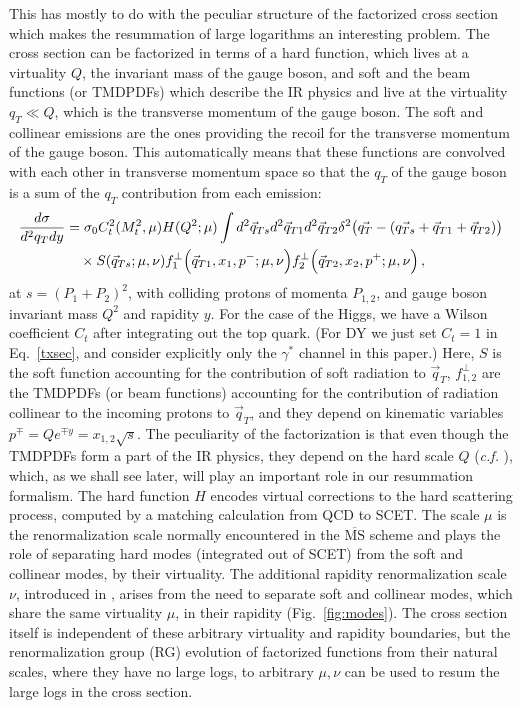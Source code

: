 \documentclass[a4,letterpaper,11pt]{article}
\newcommand{\nn}{\nonumber}
\newcommand{\MSbar}{\overline{\text{MS}}}
\newcommand{\eq}[1]{Eq.~\eqref{#1}}
\newcommand{\fig}[1]{Fig.~\ref{fig:#1}}
\begin{document}
This has mostly to do with the peculiar structure of the factorized cross section which makes the resummation of large logarithms an interesting problem. The cross section can be factorized in terms of a hard function, which lives at a virtuality $Q$, the invariant mass of the gauge boson, and soft and the beam functions (or TMDPDFs) which describe the IR physics and live at the virtuality $q_T \ll Q$, which is the transverse momentum of the gauge boson. The soft and collinear emissions are the ones providing the recoil for the transverse momentum of the gauge boson. This automatically means that these functions are convolved with each other in transverse momentum space so that the $q_T$ of the gauge boson is a sum of the $q_T$ contribution from each emission:
\begin{align}
\label{txsec}
\frac{ d \sigma} {d^2 q_T dy} &= \sigma_0 C_t^2(M_t^2,\mu) H (Q^2; \mu ) \int d^2 \vec{q}_{Ts} d^2 \vec{q}_{T1} d^2\vec{q}_{T2}  \delta^2\bigl(\vec{q_T} - (\vec{q_{Ts}} +\vec{q}_{T1}+\vec{q}_{T2}) \bigr)  \\
&\quad\times S( \vec{q}_{Ts} ;\mu,\nu) f_1^{\perp}\Bigl(\vec{q}_{T1}, x_1, p^-;\mu ,\nu\Bigr)f_2^{\perp}\Bigl(\vec{q}_{T2},x_2, p^+;\mu ,\nu\Bigr) \,, \nn
\end{align}
at $s=(P_1+P_2)^2$, with colliding protons of momenta $P_{1,2}$, and gauge boson invariant mass $Q^2$ and rapidity $y$. For the case of the Higgs, we have a Wilson coefficient $C_t$ after integrating out the top quark. (For DY we  just set $C_t=1$ in \eq{txsec}, and consider explicitly only the $\gamma^*$ channel in this paper.)
Here, $S$ is the soft function accounting for the contribution of soft radiation to $\vec{q}_T$, $f_{1,2}^\perp$ are the TMDPDFs (or beam functions) accounting for the contribution of radiation collinear to the incoming protons to $\vec{q}_T$, and they depend on kinematic variables $p^\mp = Qe^{\mp y} = x_{1,2}\sqrt{s}$. The peculiarity of the factorization is that even though the TMDPDFs form a part of the IR physics, they depend on the hard scale $Q$ (\emph{c.f.} \cite{Chiu:2007dg}), which, as we shall see later, will play an important role in our resummation formalism. The hard function $H$ encodes virtual corrections to the hard scattering process, computed by a matching calculation from QCD to SCET. The scale $\mu$ is the renormalization scale normally encountered in the $\MSbar$ scheme and plays the role of separating hard modes (integrated out of SCET) from the soft and collinear modes, by their virtuality. The additional rapidity renormalization scale $\nu$, introduced in \cite{Chiu:2011qc,Chiu:2012ir}, arises from the need to separate soft and collinear modes, which share the same virtuality $\mu$, in their rapidity (\fig{modes}). The cross section itself is independent of these arbitrary virtuality and rapidity boundaries, but the renormalization group (RG) evolution of factorized functions from their natural scales, where they have no large logs, to arbitrary $\mu,\nu$ can be used to resum the large logs in the cross section. 
\end{document}
